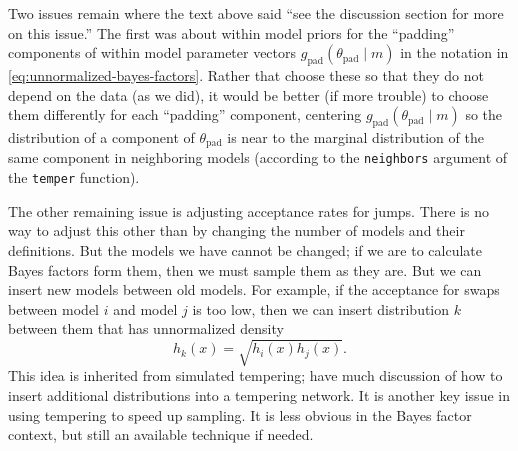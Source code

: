 \documentclass[11pt]{article}
\begin{document}
Two issues remain where the text above said ``see the discussion section for
more on this issue.''  The first was about within model priors for the
``padding'' components of within model parameter vectors
$g_{\text{pad}}(\theta_{\text{pad}} \mid m)$ in
the notation in \eqref{eq:unnormalized-bayes-factors}.
Rather that choose these so that they do not depend on the data (as we did),
it would be better (if more trouble) to choose them differently for each
``padding'' component, centering $g_{\text{pad}}(\theta_{\text{pad}} \mid m)$
so the distribution of a component of $\theta_{\text{pad}}$ is near to the
marginal distribution of the same component in neighboring models (according to
the \texttt{neighbors} argument of the \texttt{temper} function).

The other remaining issue is adjusting acceptance rates for jumps.  There
is no way to adjust this other than by changing the number of models and
their definitions.  But the models we have cannot be changed; if we are
to calculate Bayes factors form them, then we must sample them as they are.
But we can insert new models between old models.  For example,
if the acceptance for swaps between model $i$ and model $j$ is too low, then
we can insert distribution $k$ between them that has unnormalized density
$$
   h_k(x) = \sqrt{h_i(x) h_j(x)}.
$$
This idea is inherited from simulated tempering; \citep{geyer-thompson}
have much
discussion of how to insert additional distributions into a tempering network.
It is another key issue in using tempering to speed up sampling.  It is
less obvious in the Bayes factor context, but still an available technique
if needed.
\end{document}
